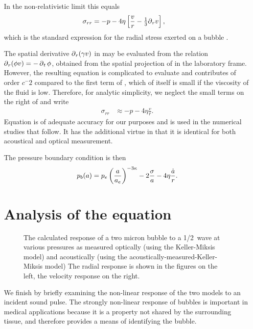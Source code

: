 In the non-relativistic limit this equals 
\begin{align}
 \sigma_{rr}  &= -p - 4\eta \left[   \frac{v}{r}  -\tfrac{1}{3}{\operatorname{\partial}_r} v  \right], \label{eqn:NRsigmarr}
\end{align}
which is  the standard expression for the radial stress exerted on a bubble \cite{Hoff2001}.

The spatial derivative ${\operatorname{\partial}_r}(\gamma v) $ in  may be evaluated from the relation ${\operatorname{\partial}_r} (\phi v) = -\operatorname{\partial}_t \phi$, 
obtained from the spatial projection of   in the laboratory frame.
However, the resulting equation is complicated to evaluate and contributes of order $c^-2$ compared to the first term of ,
which of itself is small if the viscosity of the fluid is low.
Therefore,
for analytic simplicity, we neglect the small terms on the right of 
  and write
\begin{align}
 \sigma_{rr}  &\approx -p - 4\eta  \frac{v}{r}. \label{eqn:sigmarr4}
\end{align}
Equation  is of  adequate accuracy for our purposes and is used in the numerical studies that follow.
It has the additional virtue in that it is identical for both acoustical and optical measurement.

The pressure boundary condition is then
\begin{align}
  p_b(a) = p_e \left( \frac{a}{a_e} \right)^{-3\kappa} - 2\frac{\sigma}{a} - 4\eta  \frac{\dot a}{r}. 
\end{align}

\section{Analysis of the equation}
 \begin{figure}[p!]
      \centering
      \label{fig:BubbleResponse}
      \caption{The calculated response of a two micron bubble to a \unit{1/2}\mega\hertz\ wave at various pressures
as measured optically (using the Keller-Miksis model) and acoustically (using the acoustically-measured-Keller-Miksis model)
      The radial response is shown in the figures on the left, the velocity response on the right.}
 \end{figure}
We finish by briefly examining the non-linear response of the two models to an incident sound pulse.
The strongly non-linear response of bubbles is important 
in medical applications because it is a property not  shared by the surrounding tissue,
and therefore provides a means of identifying the bubble.

